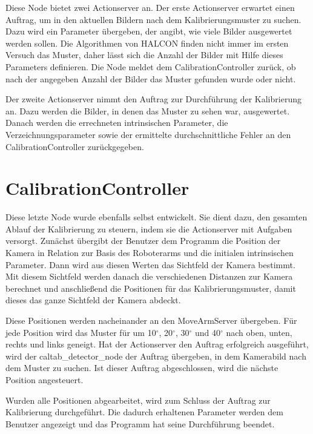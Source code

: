 Diese Node bietet zwei Actionserver an. Der erste Actionserver erwartet einen Auftrag, um in den aktuellen Bildern nach dem Kalibrierungsmuster zu suchen. Dazu wird ein Parameter übergeben, der angibt, wie viele Bilder ausgewertet werden sollen. Die Algorithmen von HALCON finden nicht immer im ersten Versuch das Muster, daher lässt sich die Anzahl der Bilder mit Hilfe dieses Parameters definieren. Die Node meldet dem CalibrationController zurück, ob nach der angegeben Anzahl der Bilder das Muster gefunden wurde oder nicht.

Der zweite Actionserver nimmt den Auftrag zur Durchführung der Kalibrierung an. Dazu werden die Bilder, in denen das Muster zu sehen war, ausgewertet. Danach werden die errechneten intrinsischen Parameter, die Verzeichnungsparameter sowie der ermittelte durchschnittliche Fehler an den CalibrationController zurückgegeben.

\section{CalibrationController} %
\label{sec:calibrationcontroller}
Diese letzte Node wurde ebenfalls selbst entwickelt. Sie dient dazu, den gesamten Ablauf der Kalibrierung zu steuern, indem sie die Actionserver mit Aufgaben versorgt. Zunächst übergibt der Benutzer dem Programm die Position der Kamera in Relation zur Basis des Roboterarms und die initialen intrinsischen Parameter. Dann wird aus diesen Werten das Sichtfeld der Kamera bestimmt. Mit diesem Sichtfeld werden danach die verschiedenen Distanzen zur Kamera berechnet und anschließend die Positionen für das Kalibrierungsmuster, damit dieses das ganze Sichtfeld der Kamera abdeckt.

Diese Positionen werden nacheinander an den MoveArmServer übergeben. Für jede Position wird das Muster für um 10$^\circ$, 20$^\circ$, 30$^\circ$ und 40$^\circ$ nach oben, unten, rechts und links geneigt. Hat der Actionserver den Auftrag erfolgreich ausgeführt, wird der caltab\_detector\_node der Auftrag übergeben, in dem Kamerabild nach dem Muster zu suchen. Ist dieser Auftrag abgeschlossen, wird die nächste Position angesteuert.

Wurden alle Positionen abgearbeitet, wird zum Schluss der Auftrag zur Kalibrierung durchgeführt. Die dadurch erhaltenen Parameter werden dem Benutzer angezeigt und das Programm hat seine Durchführung beendet.